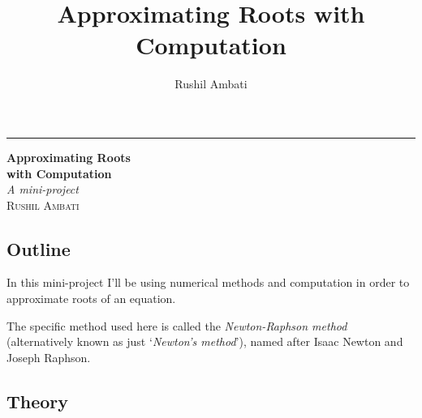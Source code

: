\documentclass[
]{article}
\author{}
\date{}
\title{Approximating Roots with Computation}
\author{Rushil Ambati}
\begin{document}

\begin{titlepage} %
	
	\raggedleft %
	
	\rule{1pt}{\textheight} %
	\hspace{0.05\textwidth} %
	\parbox[b]{0.75\textwidth}{ %
		
		{\Huge\bfseries Approximating Roots \\[0.5\baselineskip] with Computation}\\[2\baselineskip] %
		{\large\textit{A mini-project}}\\[4\baselineskip] %
		{\Large\textsc{Rushil Ambati}} %
		
		\vspace{0.5\textheight} %

	}

\end{titlepage}

\hypertarget{header-n4}{%
\subsection{Outline}\label{header-n4}}

In this mini-project I'll be using numerical methods and computation in
order to approximate roots of an equation.

The specific method used here is called the \emph{Newton-Raphson method}
(alternatively known as just `\emph{Newton's method}'), named after
Isaac Newton and Joseph Raphson.

\tableofcontents
\newpage


\hypertarget{header-n8}{%
\subsection{Theory}\label{header-n8}}
\end{document}
